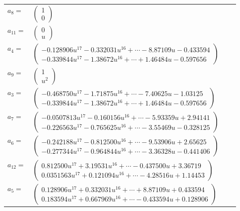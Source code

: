 \documentclass[1p]{elsarticle_modified}
\theoremstyle{definition}
\begin{document}
\begin{tabular}{m{7pt} m{180pt} m{7pt} m{180pt} }
\flushright $a_{8}=$&$\begin{pmatrix}1\\0\end{pmatrix}$ \\
\flushright $a_{11}=$&$\begin{pmatrix}0\\u\end{pmatrix}$ \\
\flushright $a_{4}=$&$\begin{pmatrix}-0.128906 u^{17}-0.332031 u^{16}+\cdots-8.87109 u-0.433594\\-0.339844 u^{17}-1.38672 u^{16}+\cdots+1.46484 u-0.597656\end{pmatrix}$ \\
\flushright $a_{9}=$&$\begin{pmatrix}1\\u^2\end{pmatrix}$ \\
\flushright $a_{3}=$&$\begin{pmatrix}-0.468750 u^{17}-1.71875 u^{16}+\cdots-7.40625 u-1.03125\\-0.339844 u^{17}-1.38672 u^{16}+\cdots+1.46484 u-0.597656\end{pmatrix}$ \\
\flushright $a_{7}=$&$\begin{pmatrix}-0.0507813 u^{17}-0.160156 u^{16}+\cdots-5.93359 u+2.94141\\-0.226563 u^{17}-0.765625 u^{16}+\cdots-3.55469 u-0.328125\end{pmatrix}$ \\
\flushright $a_{6}=$&$\begin{pmatrix}-0.242188 u^{17}-0.812500 u^{16}+\cdots-9.53906 u+2.65625\\-0.277344 u^{17}-0.964844 u^{16}+\cdots-3.36328 u-0.441406\end{pmatrix}$ \\
\flushright $a_{12}=$&$\begin{pmatrix}0.812500 u^{17}+3.19531 u^{16}+\cdots-0.437500 u+3.36719\\0.0351563 u^{17}+0.121094 u^{16}+\cdots-4.28516 u+1.14453\end{pmatrix}$ \\
\flushright $a_{5}=$&$\begin{pmatrix}0.128906 u^{17}+0.332031 u^{16}+\cdots+8.87109 u+0.433594\\0.183594 u^{17}+0.667969 u^{16}+\cdots-0.433594 u+0.128906\end{pmatrix}$ \\

\end{tabular}
\end{document}
